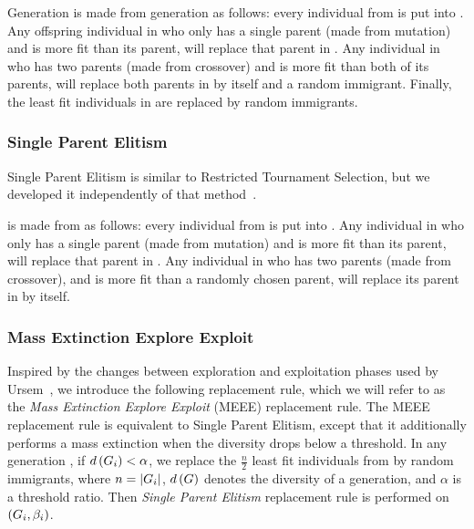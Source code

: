 Generation  is made from generation  as follows: every individual from  is put into . Any offspring individual in  who only has a single parent (made from mutation) and is more fit than its parent, will replace that parent in . Any individual in  who has two parents (made from crossover) and is more fit than both of its parents, will replace both parents in  by itself and a random immigrant. Finally, the  least fit individuals in  are replaced by random immigrants.

\subsubsection{Single Parent Elitism}
Single Parent Elitism is similar to Restricted Tournament Selection, but we developed it independently of that method~\cite[p.\ 132]{Luke2013Metaheuristics}.

 is made from  as follows: every individual from  is put into . Any individual in  who only has a single parent (made from mutation) and is more fit than its parent, will replace that parent in . Any individual in  who has two parents (made from crossover), and is more fit than a randomly chosen parent, will replace its parent in  by itself.

\subsubsection{Mass Extinction Explore Exploit}
Inspired by the changes between exploration and exploitation phases used by Ursem~\cite{ursem2002diversity}, we introduce the following replacement rule, which we will refer to as the \emph{Mass Extinction Explore Exploit} (MEEE) replacement rule. The MEEE replacement rule is equivalent to Single Parent Elitism, except that it additionally performs a mass extinction when the diversity drops below a threshold. In any generation , if $d\left(G_{i}\right) < \alpha$, we replace the $\tfrac{n}{2}$ least fit individuals from  by random immigrants, where $n = \lvert G_{i}\rvert$, $d\left(G\right)$ denotes the diversity of a generation, and $\alpha$ is a threshold ratio. Then \emph{Single Parent Elitism} replacement rule is performed on $\left(G_{i}, \beta_{i}\right)$.

